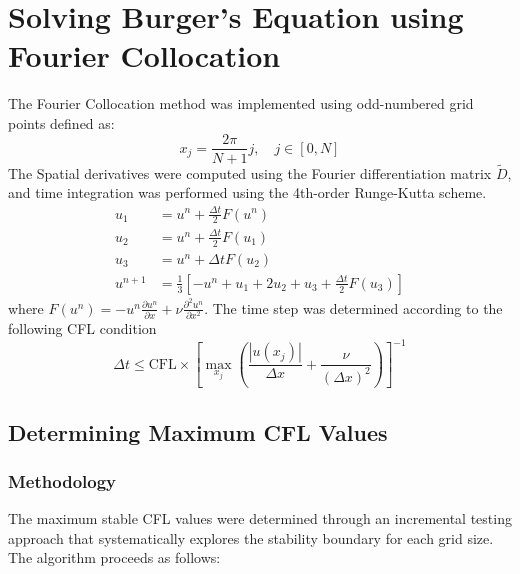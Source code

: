 \section{Solving Burger's Equation using Fourier Collocation}
The Fourier Collocation method was implemented using odd-numbered grid points defined as:
\begin{equation}
	x_j = \frac{2\pi}{N+1}j, \quad j \in [0, N]
\end{equation}
The Spatial derivatives were computed using the Fourier differentiation matrix $\tilde{D}$, and time integration was performed using the 4th-order Runge-Kutta scheme.
\begin{equation}
	\begin{align}
		u_1     & = u^n + \frac{\Delta t}{2}F(u^n)                                             \\
		u_2     & = u^n + \frac{\Delta t}{2}F(u_1)                                             \\
		u_3     & = u^n + \Delta t F(u_2)                                                      \\
		u^{n+1} & = \frac{1}{3}\left[-u^n + u_1 + 2u_2 + u_3 + \frac{\Delta t}{2}F(u_3)\right]
	\end{align}
	\label{eq:rk4_burgers}
\end{equation}
where $F(u^n) = -u^n\frac{\partial u^n}{\partial x} + \nu\frac{\partial^2 u^n}{\partial x^2}$.\newline
The time step was determined according to the following CFL condition
\begin{equation}
	\Delta t \leq \text{CFL} \times \left[\max_{x_j} \left(\frac{|u(x_j)|}{\Delta x} + \frac{\nu}{(\Delta x)^2}\right) \right]^{-1}
\end{equation}

\subsection{Determining Maximum CFL Values}

\subsubsection{Methodology}
The maximum stable CFL values were determined through an incremental testing approach that systematically explores the stability boundary for each grid size. The algorithm proceeds as follows:

